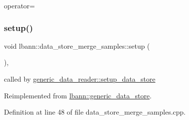 operator= 

\mbox{\label{classlbann_1_1data__store__merge__samples_a9f7f027eab6bfb65dd8001939769f476}} 
\subsubsection{\texorpdfstring{setup()}{setup()}}
{\footnotesize\ttfamily void lbann\+::data\+\_\+store\+\_\+merge\+\_\+samples\+::setup (\begin{DoxyParamCaption}{ }\end{DoxyParamCaption})\hspace{0.3cm}{\ttfamily [override]}, {\ttfamily [virtual]}}



called by \hyperlink{classlbann_1_1generic__data__reader_a8b2a09d38512fc11f1b9d572c89100a7}{generic\+\_\+data\+\_\+reader\+::setup\+\_\+data\+\_\+store} 



Reimplemented from \hyperlink{classlbann_1_1generic__data__store_a1cff17def02ee21b6ca0befeb04bb582}{lbann\+::generic\+\_\+data\+\_\+store}.



Definition at line 48 of file data\+\_\+store\+\_\+merge\+\_\+samples.\+cpp.



